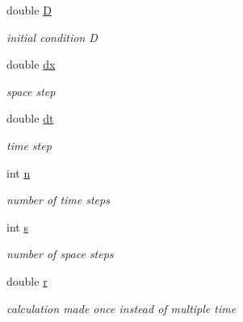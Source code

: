 \begin{DoxyCompactItemize}
\mbox{\label{class_heat_conduction_a197d8aa3aa8619edaa640c243bdfc793}} 
double \hyperlink{class_heat_conduction_a197d8aa3aa8619edaa640c243bdfc793}{D}
\begin{DoxyCompactList}\small\item\em initial condition D \end{DoxyCompactList}\item 
\mbox{\label{class_heat_conduction_a208bf1f475147b07a1f7d28533d78d9c}} 
double \hyperlink{class_heat_conduction_a208bf1f475147b07a1f7d28533d78d9c}{dx}
\begin{DoxyCompactList}\small\item\em space step \end{DoxyCompactList}\item 
\mbox{\label{class_heat_conduction_a7a7d5f6631039781c80b8c0c60e540e6}} 
double \hyperlink{class_heat_conduction_a7a7d5f6631039781c80b8c0c60e540e6}{dt}
\begin{DoxyCompactList}\small\item\em time step \end{DoxyCompactList}\item 
\mbox{\label{class_heat_conduction_ada703cd81a60d17a134b15499bbbef98}} 
int \hyperlink{class_heat_conduction_ada703cd81a60d17a134b15499bbbef98}{n}
\begin{DoxyCompactList}\small\item\em number of time steps \end{DoxyCompactList}\item 
\mbox{\label{class_heat_conduction_ad380b438b1ab0f6988342ac4023854da}} 
int \hyperlink{class_heat_conduction_ad380b438b1ab0f6988342ac4023854da}{s}
\begin{DoxyCompactList}\small\item\em number of space steps \end{DoxyCompactList}\item 
\mbox{\label{class_heat_conduction_ae152528bd4b7d0841854b32d037ace72}} 
double \hyperlink{class_heat_conduction_ae152528bd4b7d0841854b32d037ace72}{r}
\begin{DoxyCompactList}\small\item\em calculation made once instead of multiple time \end{DoxyCompactList}\item 

\end{DoxyCompactItemize}
